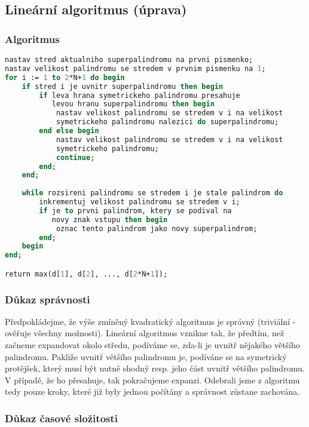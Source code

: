 \documentclass[12pt,a4paper]{article}
\begin{document}
\pagebreak

\subsection{Lineární algoritmus (úprava)}

\subsubsection{Algoritmus}

\begin{lstlisting}[language=pascal]
nastav stred aktualniho superpalindromu na prvni pismenko;
nastav velikost palindromu se stredem v prvnim pismenku na 1;
for i := 1 to 2*N+1 do begin
	if stred i je uvnitr superpalindromu then begin
		if leva hrana symetrickeho palindromu presahuje 
		   levou hranu superpalindromu then begin
			nastav velikost palindromu se stredem v i na velikost
			symetrickeho palindromu nalezici do superpalindromu;
		end else begin
			nastav velikost palindromu se stredem v i na velikost
			symetrickeho palindromu;
			continue;
		end;
	end;
		
	while rozsireni palindromu se stredem i je stale palindrom do
		inkrementuj velikost palindromu se stredem v i;
		if je to prvni palindrom, ktery se podival na 
		   novy znak vstupu then begin
			oznac tento palindrom jako novy superpalindrom;
		end;
	begin 
end;

return max(d[1], d[2], ..., d[2*N+1]);
\end{lstlisting}

\subsubsection{Důkaz správnosti}

Předpokládejme, že výše zmíněný kvadratický algoritmus je správný (triviální - ověřuje všechny možnosti). Lineární algoritmus vznikne tak, že předtím, než začneme expandovat okolo středu, podíváme se, zda-li je uvnitř nějakého většího palindromu. Pakliže uvnitř většího palindromu je, podíváne se na symetrický protějšek, který musí být nutně shodný resp. jeho část uvnitř většího palindromu. V případě, že ho přesahuje, tak pokračujeme expanzi. Odebrali jsme z algoritmu tedy pouze kroky, které již byly jednou počítány a správnost zůstane zachována.

\subsubsection{Důkaz časové složitosti}
\end{document}
